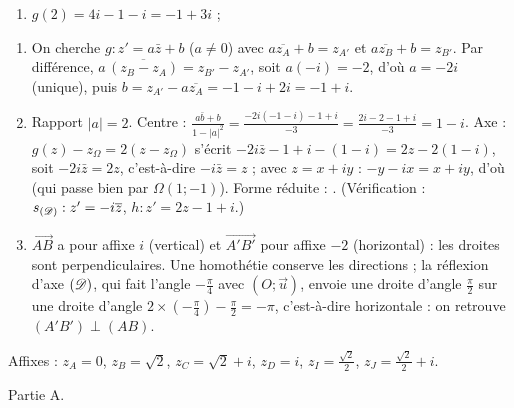 \begin{corrige}
\begin{sol}
\begin{enumerate}
            $h \circ s_{\Droite} : z' = 2i\bar{z} - 1 - i$ : c'est bien $g$.
      \item $g(2) = 4i - 1 - i = -1 + 3i$ ; 
\end{enumerate}
\end{sol}
\begin{sol}
\begin{enumerate}
      \item On cherche $g : z' = a\bar{z} + b$ ($a \neq 0$) avec $a\overline{z_A} + b = z_{A'}$ et $a\overline{z_B} + b = z_{B'}$.
            Par différence, $a\,\overline{(z_B - z_A)} = z_{B'} - z_{A'}$, soit $a(-i) = -2$, d'où $a = -2i$ (unique), puis
            $b = z_{A'} - a\overline{z_A} = -1 - i + 2i = -1 + i$. 
      \item Rapport $|a| = 2$. Centre : $\frac{a\bar{b} + b}{1 - |a|^2} = \frac{-2i(-1 - i) - 1 + i}{-3} = \frac{2i - 2 - 1 + i}{-3} = 1 - i$.
            Axe : $g(z) - z_\Omega = 2(z - z_\Omega)$ s'écrit $-2i\bar{z} - 1 + i - (1 - i) = 2z - 2(1 - i)$, soit $-2i\bar{z} = 2z$, c'est-à-dire $-i\bar{z} = z$ ;
            avec $z = x + iy$ : $-y - ix = x + iy$, d'où  (qui passe bien par $\Omega(1;-1)$).
            Forme réduite : . (Vérification : $s_{(\mathscr{D})} : z' = -i\overline{z}$, $h : z' = 2z - 1 + i$.)
      \item $\overrightarrow{AB}$ a pour affixe $i$ (vertical) et $\overrightarrow{A'B'}$ pour affixe $-2$ (horizontal) : les droites sont perpendiculaires.
            Une homothétie conserve les directions ; la réflexion d'axe $(\mathscr{D})$, qui fait l'angle $-\frac{\pi}{4}$ avec $(O;\vec{u})$, envoie une droite d'angle $\frac{\pi}{2}$
            sur une droite d'angle $2 \times (-\frac{\pi}{4}) - \frac{\pi}{2} = -\pi$, c'est-à-dire horizontale : on retrouve $(A'B') \perp (AB)$.
\end{enumerate}
\end{sol}
\begin{sol}
Affixes : $z_A = 0$, $z_B = \sqrt2$, $z_C = \sqrt2 + i$, $z_D = i$, $z_I = \frac{\sqrt2}{2}$, $z_J = \frac{\sqrt2}{2} + i$.
\begin{description}
      \item[Partie A.]
      \begin{enumerate}

\end{enumerate}
\end{description}
\end{sol}
\end{corrige}
